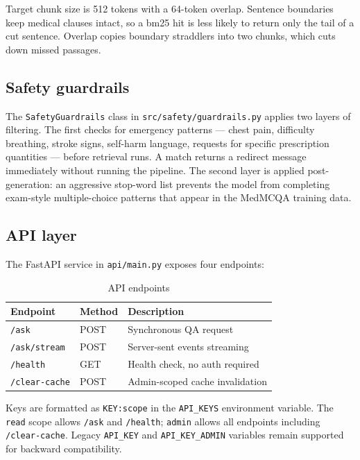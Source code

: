 Target chunk size is 512 tokens with a 64-token overlap. Sentence boundaries keep medical clauses intact, so a \ac{bm25} hit is less likely to return only the tail of a cut sentence. Overlap copies boundary straddlers into two chunks, which cuts down missed passages.

\subsection{Safety guardrails}

The \texttt{SafetyGuardrails} class in \texttt{src/safety/guardrails.py} applies two layers of filtering. The first checks for emergency patterns --- chest pain, difficulty breathing, stroke signs, self-harm language, requests for specific prescription quantities --- before retrieval runs. A match returns a redirect message immediately without running the pipeline. The second layer is applied post-generation: an aggressive stop-word list prevents the model from completing exam-style multiple-choice patterns that appear in the MedMCQA training data.

\subsection{API layer}

The FastAPI service in \texttt{api/main.py} exposes four endpoints:

\begin{table}[htbp]
\centering
\caption{API endpoints}
\renewcommand{\arraystretch}{1.3}
\begin{tabular}{|l|l|l|}
\hline
\textbf{Endpoint} & \textbf{Method} & \textbf{Description} \\
\hline
\texttt{/ask} & POST & Synchronous QA request \\
\texttt{/ask/stream} & POST & Server-sent events streaming \\
\texttt{/health} & GET & Health check, no auth required \\
\texttt{/clear-cache} & POST & Admin-scoped cache invalidation \\
\hline
\end{tabular}
\end{table}

Keys are formatted as \texttt{KEY:scope} in the \texttt{API\_KEYS} environment variable. The \texttt{read} scope allows \texttt{/ask} and \texttt{/health}; \texttt{admin} allows all endpoints including \texttt{/clear-cache}. Legacy \texttt{API\_KEY} and \texttt{API\_KEY\_ADMIN} variables remain supported for backward compatibility.
